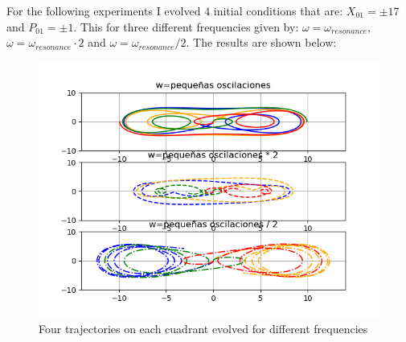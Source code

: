 \documentclass[idxtotoc,hyperref,openany]{labbook} %
\begin{document}
For the following experiments I evolved $4$ initial conditions that are: $X_01=\pm 17$ and $P_01=\pm 1$. This for three different frequencies given by: $\omega=\omega_{resonance}$, $\omega=\omega_{resonance}\cdot 2$ and $\omega=\omega_{resonance}/2$. The results are shown below:
\begin{figure}[H] %
\begin{center}
\includegraphics[width=1\linewidth]{condini_freq_mitad_doble.png}
\end{center}
\caption{Four trajectories on each cuadrant evolved for different frequencies}
\label{Trajectories-frequencies}
\end{figure}
\end{document}
